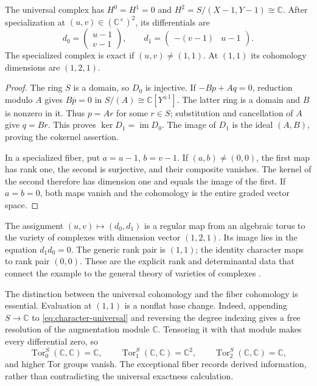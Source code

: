 \begin{proposition}
The universal complex has $H^0=H^1=0$ and
$H^2=S/(X-1,Y-1)\cong\mathbb C$.  After specialization at
$(u,v)\in(\mathbb C^\times)^2$, its differentials are
\[
 d_0=\begin{pmatrix}u-1\\v-1\end{pmatrix},\qquad
 d_1=\begin{pmatrix}-(v-1)&u-1\end{pmatrix}.
\]
The specialized complex is exact if $(u,v)\ne(1,1)$.  At $(1,1)$
its cohomology dimensions are $(1,2,1)$.
\end{proposition}
\begin{proof}
The ring $S$ is a domain, so $D_0$ is injective.  If
$-Bp+Aq=0$, reduction modulo $A$ gives $B\overline p=0$ in
$S/(A)\cong\mathbb C[Y^{\pm1}]$.  The latter ring is a domain and
$B$ is nonzero in it.  Thus $p=Ar$ for some $r\in S$; substitution
and cancellation of $A$ give $q=Br$.  This proves
$\ker D_1=\operatorname{im}D_0$.  The image of $D_1$ is the ideal
$(A,B)$, proving the cokernel assertion.

In a specialized fiber, put $a=u-1$, $b=v-1$.  If $(a,b)\ne(0,0)$,
the first map has rank one, the second is surjective, and their composite
vanishes.  The kernel of the second therefore has dimension one and equals
the image of the first.  If $a=b=0$, both maps vanish and the cohomology is
the entire graded vector space.
\end{proof}

The assignment $(u,v)\mapsto(d_0,d_1)$ is a regular map from an algebraic
torus to the variety of complexes with dimension vector $(1,2,1)$.  Its
image lies in the equation $d_1d_0=0$.  The generic rank pair is $(1,1)$;
the identity character maps to rank pair $(0,0)$.  These are the explicit
rank and determinantal data that connect the example to the general theory
of varieties of complexes \cite{v2BE1973,v2DS1981,v2DEP1982}.

The distinction between the universal cohomology and the fiber cohomology
is essential.  Evaluation at $(1,1)$ is a nonflat base change.  Indeed,
appending $S\to\mathbb C$ to \eqref{eq:character-universal} and
reversing the degree indexing gives a free resolution of the augmentation
module $\mathbb C$.  Tensoring it with that module makes every differential
zero, so
\[
 \operatorname{Tor}_0^S(\mathbb C,\mathbb C)=\mathbb C,\qquad
 \operatorname{Tor}_1^S(\mathbb C,\mathbb C)=\mathbb C^2,\qquad
 \operatorname{Tor}_2^S(\mathbb C,\mathbb C)=\mathbb C,
\]
and higher Tor groups vanish.  The exceptional fiber records derived
information, rather than contradicting the universal exactness calculation.

